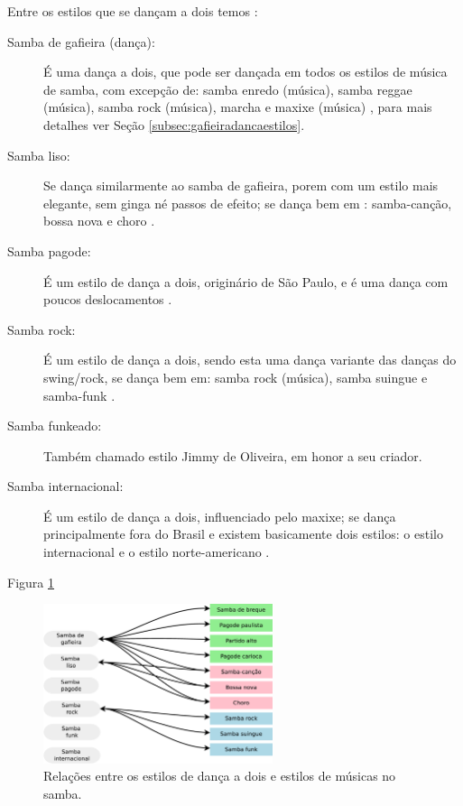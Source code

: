 Entre os estilos que se dançam a dois temos \cite[pp. 134]{perna2002samba}:
\begin{description}
\item[Samba de gafieira (dança):] É uma dança a dois, que pode ser dançada em todos os estilos de música de samba,
com excepção de: samba enredo (música), samba reggae (música), samba rock (música), marcha e maxixe (música) \cite[pp. 134]{perna2002samba}, para mais detalhes ver Seção \ref{subsec:gafieiradancaestilos}.

\item[Samba liso:] Se dança similarmente ao samba de gafieira, 
porem com um estilo mais elegante, sem ginga né passos de efeito;
se dança bem em : samba-canção, bossa nova e choro \cite[pp. 134]{perna2002samba}.

\item[Samba pagode:] É um estilo de dança a dois, originário de São Paulo, 
e é uma dança com poucos deslocamentos \cite[pp. 134]{perna2002samba}.

\item[Samba rock:] É um estilo de dança a dois, sendo esta uma dança variante das danças do swing/rock,
se dança bem em: samba rock (música), samba suingue e samba-funk \cite[pp. 135, 138]{perna2002samba}.

\item[Samba funkeado:] Também chamado estilo Jimmy de Oliveira, em honor a seu criador.

\item[Samba internacional:] É um estilo de dança a dois, influenciado pelo maxixe;
se dança principalmente fora do Brasil e existem basicamente dois estilos: 
o estilo internacional e o estilo norte-americano \cite[pp. 134-135]{perna2002samba}.

\end{description}

Figura \ref{fig:sambadavavsmusica} \cite[pp. 134-138]{perna2002samba}

\begin{figure}[h]
  \centering
    \includegraphics[width=0.6\textwidth]{chapters/cap-historia/dancavcmusica.eps}
  \caption{Relações entre os estilos de dança a dois e estilos de músicas no samba.}
\label{fig:sambadavavsmusica}
\end{figure}


